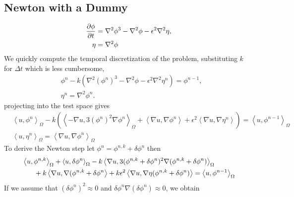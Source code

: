\documentclass{article}
\newcommand\ang[1]{\left\langle #1 \right\rangle}
\begin{document}
\subsection*{Newton with a Dummy}

\begin{align}
    \diffp{\phi}{t} &= \nabla^2 \phi^3
                    - \nabla^2 \phi
                    - \epsilon^2\nabla^2 \eta,\\
    \eta            &= \nabla^2 \phi
\end{align}
We quickly compute the temporal discretization of the problem, substituting
$k$ for $\Delta t$ which is less cumbersome,
\begin{align}
    &\phi^n - k(\nabla^2 (\phi^n)^3 - \nabla^2 \phi - \epsilon^2\nabla^2 \eta^n) 
        = \phi^{n-1},\\
    &\eta^n = \nabla^2 \phi^n.
\end{align}
projecting into the test space gives
\begin{align}
    &\ang{u, \phi^n}_\Omega -k\left(
        \ang{-\nabla u, 3(\phi^n)^2\nabla\phi^n}_\Omega
        + \ang{\nabla u, \nabla \phi^n}
        + \epsilon^2\ang{\nabla u,\nabla \eta^n}
    \right) = \ang{u, \phi^{n-1}}_\Omega\\
    &\ang{u, \eta^n}_\Omega = \ang{\nabla u, \nabla \phi^n}_\Omega
\end{align}
To derive the Newton step let $\phi^n = \phi^{n,k} + \delta \phi^n$ then
\begin{align}
    &\ang{u, \phi^{n,k}}_\Omega + \ang{u,\delta\phi^n}_\Omega 
        - k \ang{\nabla u, 3(\phi^{n,k}+\delta\phi^n)^2\nabla(\phi^{n,k}+\delta\phi^n)}_\Omega\\
    &\hspace{4ex}+ k\ang{\nabla u, \nabla (\phi^{n,k} + \delta\phi^n} + k\epsilon^2\ang{\nabla u,\nabla \eta(\phi^{n,k} + \delta\phi^n)} = \ang{u, \phi^{n-1}}_\Omega
\end{align}
If we assume that $(\delta \phi^n)^2 \approx 0$ and
$\delta\phi^n\nabla(\delta\phi^n)\approx 0$, we obtain
\end{document}
